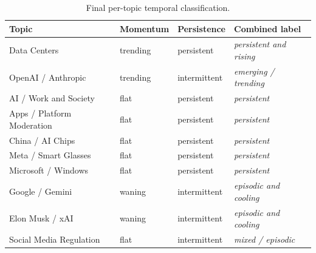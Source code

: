 \documentclass[11pt,a4paper]{article}
\begin{document}
\begin{table}[H]
\centering
\small
\caption{Final per-topic temporal classification.}
\label{tab:temporal}
\renewcommand{\arraystretch}{1.15}
\begin{tabular}{l l l l}
\toprule
\textbf{Topic} & \textbf{Momentum} & \textbf{Persistence} & \textbf{Combined label} \\
\midrule
Data Centers              & trending  & persistent    & \emph{persistent and rising} \\
OpenAI / Anthropic        & trending  & intermittent  & \emph{emerging / trending}   \\
AI / Work and Society     & flat      & persistent    & \emph{persistent}            \\
Apps / Platform Moderation& flat      & persistent    & \emph{persistent}            \\
China / AI Chips          & flat      & persistent    & \emph{persistent}            \\
Meta / Smart Glasses      & flat      & persistent    & \emph{persistent}            \\
Microsoft / Windows       & flat      & persistent    & \emph{persistent}            \\
Google / Gemini           & waning    & intermittent  & \emph{episodic and cooling}  \\
Elon Musk / xAI           & waning    & intermittent  & \emph{episodic and cooling}  \\
Social Media Regulation   & flat      & intermittent  & \emph{mixed / episodic}      \\
\bottomrule
\end{tabular}
\end{table}
\end{document}
